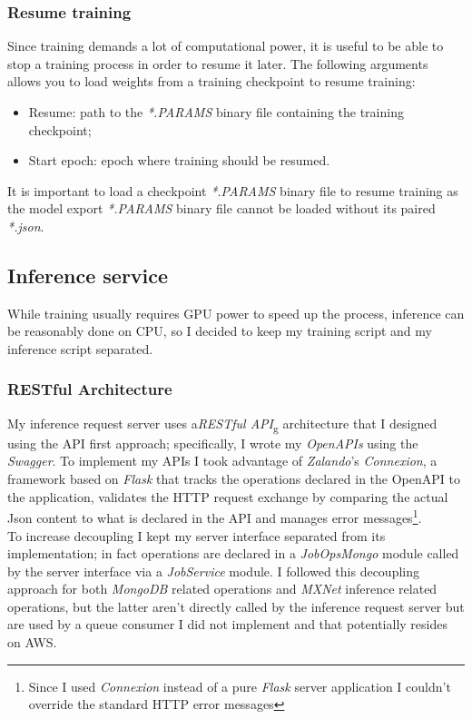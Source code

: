 \subsubsection{Resume training}
Since training demands a lot of computational power, it is useful to be able to stop a training process in order to resume it later. The following arguments allows you to load weights from a training checkpoint to resume training:
\begin{itemize}
	\item Resume: path to the \emph{*.PARAMS} binary file containing the training checkpoint;
	\item Start epoch: epoch where training should be resumed.
\end{itemize}
It is important to load a checkpoint \emph{*.PARAMS} binary file to resume training as the model export \emph{*.PARAMS} binary file cannot be loaded without its paired \emph{*.json}.

\subsection{Inference service}
While training usually requires GPU power to speed up the process, inference can be reasonably done on CPU, so I decided to keep my training script and my inference script separated.

\subsubsection{RESTful Architecture}
My inference request server uses a\emph{\gls{RESTful API}}\textsubscript{g} architecture that I designed using the API first approach; specifically, I wrote my \emph{OpenAPIs} using the \emph{Swagger}. To implement my APIs I took advantage of \emph{Zalando}'s \emph{Connexion}, a framework based on \emph{Flask} that tracks the operations declared in the OpenAPI to the application, validates the HTTP request exchange by comparing the actual Json content to what is declared in the API and manages error messages\footnote{Since I used \emph{Connexion} instead of a pure \emph{Flask} server application I couldn't override the standard HTTP error messages}. \\
To increase decoupling I kept my server interface separated from its implementation; in fact operations are declared in a \emph{JobOpsMongo} module called by the server interface via a \emph{JobService} module. I followed this decoupling approach for both \emph{MongoDB} related operations and \emph{MXNet} inference related operations, but the latter aren't directly called by the inference request server but are used by a queue consumer I did not implement and that potentially resides on AWS.


